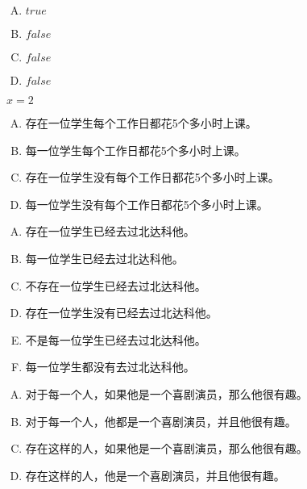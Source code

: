 {{        %
        \begin{practices}
            \begin{enumerate}[A.]
                \item $true$
                \item $false$
                \item $false$
                \item $false$
            \end{enumerate}
        \end{practices}

        \begin{practices}
            $x = 2$
        \end{practices}

        \begin{practices}
            \begin{enumerate}[A.]
                \item 存在一位学生每个工作日都花5个多小时上课。
                \item 每一位学生每个工作日都花5个多小时上课。
                \item 存在一位学生没有每个工作日都花5个多小时上课。
                \item 每一位学生没有每个工作日都花5个多小时上课。
            \end{enumerate}
        \end{practices}

        \begin{practices}
            \begin{enumerate}[A.]
                \item 存在一位学生已经去过北达科他。
                \item 每一位学生已经去过北达科他。
                \item 不存在一位学生已经去过北达科他。
                \item 存在一位学生没有已经去过北达科他。
                \item 不是每一位学生已经去过北达科他。
                \item 每一位学生都没有去过北达科他。
            \end{enumerate}
        \end{practices}

        \begin{practices}
            \begin{enumerate}[A.]
                \item 对于每一个人，如果他是一个喜剧演员，那么他很有趣。
                \item 对于每一个人，他都是一个喜剧演员，并且他很有趣。
                \item 存在这样的人，如果他是一个喜剧演员，那么他很有趣。
                \item 存在这样的人，他是一个喜剧演员，并且他很有趣。
            \end{enumerate}
        \end{practices}

}}
